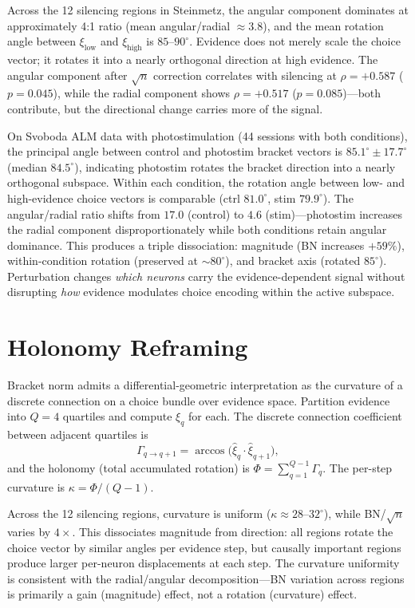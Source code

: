 \documentclass[9pt,lineno]{elife}
\begin{document}
Across the 12 silencing regions in Steinmetz, the angular component dominates at approximately 4:1 ratio (mean angular/radial $\approx 3.8$), and the mean rotation angle between $\xi_{\text{low}}$ and $\xi_{\text{high}}$ is $85$--$90^\circ$. Evidence does not merely scale the choice vector; it rotates it into a nearly orthogonal direction at high evidence. The angular component after $\sqrt{n}$ correction correlates with silencing at $\rho = +0.587$ ($p = 0.045$), while the radial component shows $\rho = +0.517$ ($p = 0.085$)---both contribute, but the directional change carries more of the signal.

On Svoboda ALM data with photostimulation \citep{dandi000007, dandi000009} (44 sessions with both conditions), the principal angle between control and photostim bracket vectors is $85.1^\circ \pm 17.7^\circ$ (median $84.5^\circ$), indicating photostim rotates the bracket direction into a nearly orthogonal subspace. Within each condition, the rotation angle between low- and high-evidence choice vectors is comparable (ctrl $81.0^\circ$, stim $79.9^\circ$). The angular/radial ratio shifts from $17.0$ (control) to $4.6$ (stim)---photostim increases the radial component disproportionately while both conditions retain angular dominance. This produces a triple dissociation: magnitude (BN increases $+59\%$), within-condition rotation (preserved at ${\sim}80^\circ$), and bracket axis (rotated $85^\circ$). Perturbation changes \emph{which neurons} carry the evidence-dependent signal without disrupting \emph{how} evidence modulates choice encoding within the active subspace.

\section{Holonomy Reframing}
\label{app:holonomy}

Bracket norm admits a differential-geometric interpretation as the curvature of a discrete connection on a choice bundle over evidence space. Partition evidence into $Q = 4$ quartiles and compute $\xi_q$ for each. The discrete connection coefficient between adjacent quartiles is
\[
\Gamma_{q \to q+1} = \arccos\!\bigl(\hat{\xi}_q \cdot \hat{\xi}_{q+1}\bigr),
\]
and the holonomy (total accumulated rotation) is $\Phi = \sum_{q=1}^{Q-1} \Gamma_q$. The per-step curvature is $\kappa = \Phi / (Q - 1)$.

Across the 12 silencing regions, curvature is uniform ($\kappa \approx 28$--$32^\circ$), while BN/\!$\sqrt{n}$ varies by $4\times$. This dissociates magnitude from direction: all regions rotate the choice vector by similar angles per evidence step, but causally important regions produce larger per-neuron displacements at each step. The curvature uniformity is consistent with the radial/angular decomposition---BN variation across regions is primarily a gain (magnitude) effect, not a rotation (curvature) effect.
\end{document}
